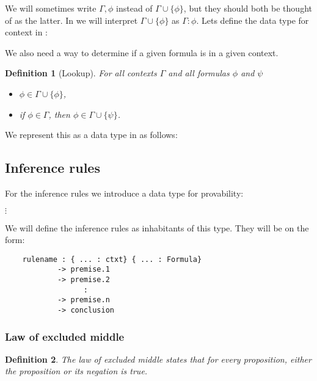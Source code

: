 \documentclass[titlepage]{article}
\newtheorem{definition}{Definition}[section]
\begin{document}
We will sometimes write $\Gamma, \phi$ instead of $\Gamma \cup \{\phi\}$, but they should both be thought of as the latter. In \Agda we will interpret $\Gamma \cup \{\phi\}$ as $\Gamma : \phi$. Lets define the data type for context in \Agda:

We also need a way to determine if a given formula is in a given context. 
\begin{definition}[Lookup]\label{lookup}
    For all contexts $\Gamma$ and all formulas $\phi$ and $\psi$
    \begin{itemize}
        \item $\phi \in \Gamma \cup \{\phi\}$,
        \item if $\phi \in \Gamma$, then $\phi \in \Gamma \cup \{\psi\}$.
    \end{itemize}
\end{definition}
We represent this as a data type in \Agda as follows:




\subsection{Inference rules}

For the inference rules we introduce a data type for provability:

\hspace{40mm}$\vdots$
\vspace{4mm}

We will define the inference rules as inhabitants of this type. They will be on the form:
\begin{verbatim}
    rulename : { ... : ctxt} { ... : Formula}
            -> premise.1
            -> premise.2
                  :
            -> premise.n
            -> conclusion
\end{verbatim}


\subsubsection{Law of excluded middle}

\begin{definition}
    The law of excluded middle states that for every proposition, either the proposition or its negation is true.
\end{definition}
\end{document}
